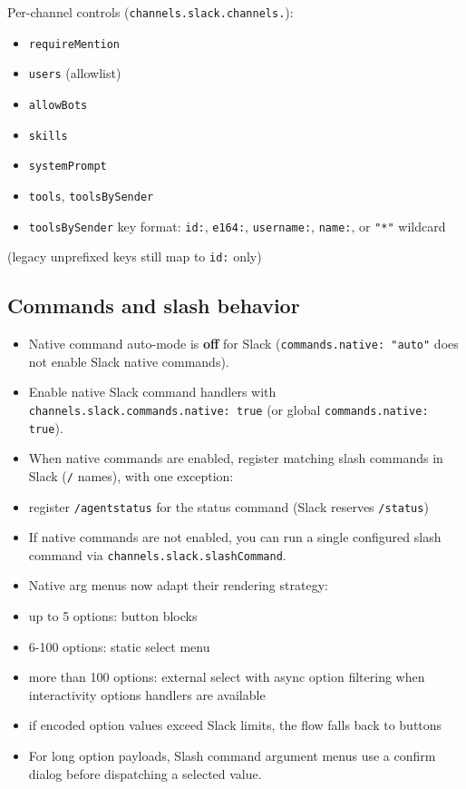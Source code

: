 Per-channel controls (\texttt{channels.slack.channels.}):

\begin{itemize}
  \item \texttt{requireMention}
  \item \texttt{users} (allowlist)
  \item \texttt{allowBots}
  \item \texttt{skills}
  \item \texttt{systemPrompt}
  \item \texttt{tools}, \texttt{toolsBySender}
  \item \texttt{toolsBySender} key format: \texttt{id:}, \texttt{e164:}, \texttt{username:}, \texttt{name:}, or \texttt{"*"} wildcard
\end{itemize}

(legacy unprefixed keys still map to \texttt{id:} only)


\subsection{Commands and slash behavior}


\begin{itemize}
  \item Native command auto-mode is \textbf{off} for Slack (\texttt{commands.native: "auto"} does not enable Slack native commands).
  \item Enable native Slack command handlers with \texttt{channels.slack.commands.native: true} (or global \texttt{commands.native: true}).
  \item When native commands are enabled, register matching slash commands in Slack (\texttt{/} names), with one exception:
  \item register \texttt{/agentstatus} for the status command (Slack reserves \texttt{/status})
  \item If native commands are not enabled, you can run a single configured slash command via \texttt{channels.slack.slashCommand}.
  \item Native arg menus now adapt their rendering strategy:
  \item up to 5 options: button blocks
  \item 6-100 options: static select menu
  \item more than 100 options: external select with async option filtering when interactivity options handlers are available
  \item if encoded option values exceed Slack limits, the flow falls back to buttons
  \item For long option payloads, Slash command argument menus use a confirm dialog before dispatching a selected value.
\end{itemize}


